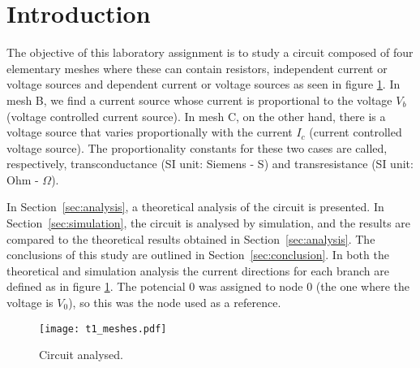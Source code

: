 \section{Introduction}
\label{sec:introduction}

The objective of this laboratory assignment is to study a circuit composed of
four elementary meshes where these can contain resistors, independent current or voltage sources
and dependent current or voltage sources as seen in figure
\ref{fig:rc}.
In mesh B, we find a current source whose current is proportional to the voltage $V_{b}$
(voltage controlled current source).
In mesh C, on the other hand, there is a voltage source that varies proportionally
with the current $I_c$ (current controlled voltage source).
The proportionality constants for these two cases are called, respectively,
transconductance (SI unit: Siemens - S) and transresistance (SI unit: Ohm - $\Omega$).

In Section~\ref{sec:analysis}, a theoretical analysis of the circuit is
presented. In Section~\ref{sec:simulation}, the circuit is analysed by
simulation, and the results are compared to the theoretical results obtained in
Section~\ref{sec:analysis}. The conclusions of this study are outlined in
Section~\ref{sec:conclusion}. In both the theoretical and simulation analysis the current directions for each branch are defined as in figure \ref{fig:rc}. The potencial $0$ was assigned to node $0$ (the one where the voltage is $V_{0}$), so this was the node used as a reference.

\begin{figure}[h] \centering
    \texttt{[image: t1\_meshes.pdf]}
    \caption{Circuit analysed.}
    \label{fig:rc}
\end{figure}


